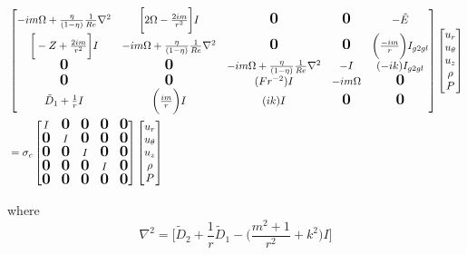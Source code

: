 \documentclass{article}
\newcommand{\bigzero}{\mbox{\normalfont\Large\bfseries 0}}
\begin{document}
\begin{align}\label{eq:hoc_interpolate_face_to_center_naive}
 \begin{split}
 &\begin{bmatrix}%
    -im\Omega +  \frac{\eta}{(1-\eta)} \frac{1}{Re} \nabla^{2} 
  & \bigg[2\Omega - \frac{2im}{r^{2}}\bigg] I
  & \bigzero 
  & \bigzero
  & -\tilde{E}\\
\bigg[-Z + \frac{2im}{r^{2}}\bigg] I 
& -im\Omega +  \frac{\eta}{(1-\eta)} \frac{1}{Re}\nabla^{2} 
& \bigzero &  \bigzero & \bigg(\frac{-im}{r}\bigg)I_{g2gl}\\
%
  \bigzero  & \bigzero & -im\Omega +  \frac{\eta}{(1-\eta)} \frac{1}{Re}\nabla^{2} & -I & (-ik)I_{g2gl}\\
%
  \bigzero  & \bigzero  & (Fr^{-2})I  & -im\Omega & \bigzero\\
  \tilde{D}_{1} + \frac{1}{r}I & \bigg(\frac{im}{r}\bigg)I & (ik)I & \bigzero & \bigzero\\
\end{bmatrix}
\begin{bmatrix}
 u_{r}\\
 u_{\theta}\\
 u_{z}\\
 \rho\\
 P\\
 \end{bmatrix}\\
&= \sigma_{c} 
\begin{bmatrix}
 I & \bigzero & \bigzero & \bigzero & \bigzero\\
%
%
 \bigzero & I & \bigzero & \bigzero & \bigzero\\
%
%
  \bigzero & \bigzero & I & \bigzero & \bigzero\\
%
%
  \bigzero & \bigzero & \bigzero & I & \bigzero\\
%
  \bigzero & \bigzero & \bigzero & \bigzero & \bigzero\\
\end{bmatrix}
\begin{bmatrix}
 u_{r}\\
 u_{\theta}\\
 u_{z}\\
 \rho\\
 P\\
 \end{bmatrix}
 \end{split}
\end{align}

where
\begin{equation}
 \nabla^{2} = \bigg[\tilde{D}_{2} + \frac{1}{r}\tilde{D}_{1} - \bigg( \frac{m^{2} + 1}{r^{2}} + k^{2}\bigg)I\bigg]
\end{equation}
\end{document}

